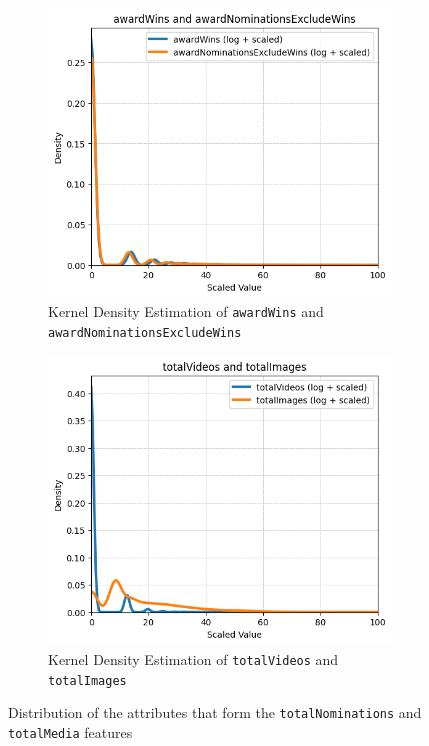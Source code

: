 \begin{figure}[H]
    \centering
    \begin{subfigure}{0.43\textwidth}
        \includegraphics[width=\textwidth]{plots/nominations_distrib.png}
        \captionsetup{width=0.9\linewidth, justification=centering}
        \caption{Kernel Density Estimation of \texttt{awardWins} and \texttt{awardNominationsExcludeWins}}
        \label{fig:sub1}
    \end{subfigure}
    \begin{subfigure}{0.43\textwidth}
        \includegraphics[width=\textwidth]{plots/totalVideos_Images_distrib.png}
        \captionsetup{width=0.9\linewidth, justification=centering}
        \caption{Kernel Density Estimation of \texttt{totalVideos} and \texttt{totalImages}}
        \label{fig:sub2}
    \end{subfigure}
    \captionsetup{justification=centering}
    \caption{Distribution of the attributes that form the \texttt{totalNominations} and \texttt{totalMedia} features}
    \label{fig:distrib}
\end{figure}

